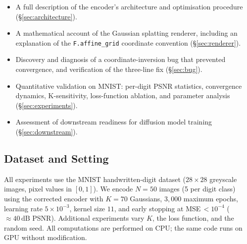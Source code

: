 \begin{itemize}[leftmargin=2em]
  \item A full description of the encoder's architecture and optimisation procedure
        (\S\ref{sec:architecture}).
  \item A mathematical account of the Gaussian splatting renderer, including an
        explanation of the \texttt{F.affine\_grid} coordinate convention
        (\S\ref{sec:renderer}).
  \item Discovery and diagnosis of a coordinate-inversion bug that prevented
        convergence, and verification of the three-line fix (\S\ref{sec:bug}).
  \item Quantitative validation on MNIST: per-digit PSNR statistics, convergence
        dynamics, K-sensitivity, loss-function ablation, and parameter analysis
        (\S\ref{sec:experiments}).
  \item Assessment of downstream readiness for diffusion model training
        (\S\ref{sec:downstream}).
\end{itemize}

\subsection{Dataset and Setting}

All experiments use the MNIST handwritten-digit dataset
($28 \times 28$ greyscale images, pixel values in $[0,1]$).
We encode $N = 50$ images (5 per digit class) using the corrected encoder
with $K = 70$ Gaussians, $3{,}000$ maximum epochs, learning rate $5\!\times\!10^{-3}$,
kernel size $11$, and early stopping at MSE\,$ < 10^{-4}$ ($\approx 40\,\text{dB}$
PSNR).  Additional experiments vary $K$, the loss function, and the random seed.
All computations are performed on CPU; the same code runs on GPU without modification.
